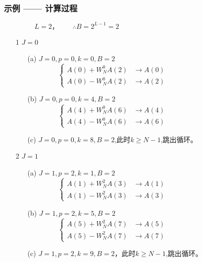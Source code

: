 \documentclass[notheorems,compress,mathserif,table]{beamer}
\begin{document}
\begin{frame}[allowframebreaks]\frametitle{示例 —— 计算过程}%
$$L=2，\quad\quad\therefore B=2^{L-1}=2\quad\quad\quad\quad\quad\quad\quad\quad\quad\quad\quad\quad\quad\quad\quad$$

\begin{enumerate}
  \item [1] $J=0$
      \begin{enumerate}
      \item [(a)] $J=0,p=0,k=0,B=2$
                $$
                    \left\{ \begin{aligned}
                    A(0) + W_N^{0}A(2) &\longrightarrow A(0)\quad\quad\quad\quad\quad\quad\quad\quad \\
                    A(0) - W_N^{0}A(2) &\longrightarrow A(2)
                    \end{aligned} \right.
                $$
      \item [(b)] $J=0,p=0,k=4,B=2$
                $$
                    \left\{ \begin{aligned}
                    A(4) + W_N^{0}A(6) &\longrightarrow A(4)\quad\quad\quad\quad\quad\quad\quad\quad \\
                    A(4) - W_N^{0}A(6) &\longrightarrow A(6)
                    \end{aligned} \right.
                $$
      \item [(c)] $J=0,p=0,k=8,B=2$,此时$ k\geq N-1 $,跳出循环。
      \end{enumerate}
      \newpage
  \item [2] $J=1$
      \begin{enumerate}
      \item [(a)]$J=1,p=2,k=1,B=2$
                $$
                    \left\{ \begin{aligned}
                    A(1) + W_N^{2}A(3) &\longrightarrow A(1)\quad\quad\quad\quad\quad\quad\quad\quad \\
                    A(1) - W_N^{2}A(3) &\longrightarrow A(3)
                    \end{aligned} \right.
                $$                
      \item [(b)]$J=1,p=2,k=5,B=2$
                $$
                    \left\{ \begin{aligned}
                    A(5) + W_N^{2}A(7) &\longrightarrow A(5)\quad\quad\quad\quad\quad\quad\quad\quad \\
                    A(5) - W_N^{2}A(7) &\longrightarrow A(7)
                    \end{aligned} \right.
                $$
      \item [(c)]$J=1,p=2,k=9,B=2$，此时$ k\geq N-1 $,跳出循环。
      \end{enumerate}
\end{enumerate}
\end{frame}
\end{document}
